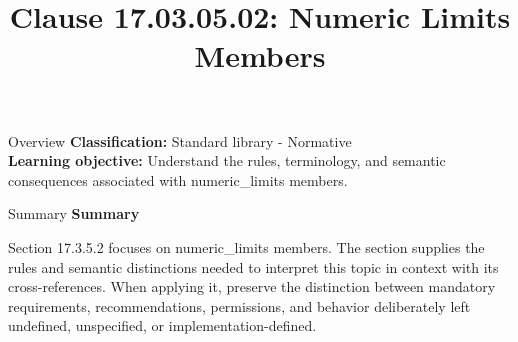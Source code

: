\documentclass[10pt,letterpaper]{article}
\title{Clause 17.03.05.02: Numeric Limits Members}
\author{}
\date{}
\begin{document}
\maketitle
\begin{CornellOverviewBox}{Overview}
\textbf{Classification:} Standard library - Normative\\[2pt]
\textbf{Learning objective:} Understand the rules, terminology, and semantic consequences associated with numeric\_limits members.
\end{CornellOverviewBox}\begin{CornellSummaryBox}{Summary}
{\sffamily\bfseries\color{Accent} Summary}\par\vspace{3pt}Section 17.3.5.2 focuses on numeric\_limits members. The section supplies the rules and semantic distinctions needed to interpret this topic in context with its cross-references. When applying it, preserve the distinction between mandatory requirements, recommendations, permissions, and behavior deliberately left undefined, unspecified, or implementation-defined.
\end{CornellSummaryBox}
\end{document}
